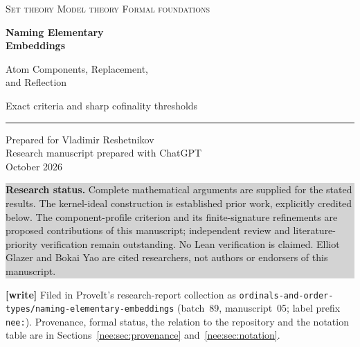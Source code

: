 \documentclass[11pt,letterpaper]{article}
\numberwithin{equation}{section}
\theoremstyle{plain}
\theoremstyle{definition}
\theoremstyle{remark}
\newcommand{\status}[1]{\par\noindent\colorbox{lightgray}{\parbox{\dimexpr\linewidth-2\fboxsep\relax}{#1}}\par}
\begin{document}
\hypersetup{pageanchor=false}
\begin{titlepage}
\color{ink}
\noindent\textsc{Set theory \;\textbar\; Model theory \;\textbar\; Formal foundations}
\vspace{1.1in}
\begin{flushleft}
{\Huge\bfseries Naming Elementary\\[5pt] Embeddings}\par
\vspace{0.25in}
{\Large Atom Components, Replacement,\\[3pt] and Reflection}\par
\vspace{0.32in}
{\large Exact criteria and sharp cofinality thresholds}\par
\end{flushleft}
\vspace{0.35in}
\noindent\rule{\linewidth}{0.7pt}
\vspace{0.2in}
\noindent Prepared for Vladimir Reshetnikov\\
Research manuscript prepared with ChatGPT\\
October 2026
\vfill
\status{\textbf{Research status.} Complete mathematical arguments are supplied for the stated results. The kernel-ideal construction is established prior work, explicitly credited below. The component-profile criterion and its finite-signature refinements are proposed contributions of this manuscript; independent review and literature-priority verification remain outstanding. No Lean verification is claimed. Elliot Glazer and Bokai Yao are cited researchers, not authors or endorsers of this manuscript.}
\vspace{6pt}
{\footnotesize\noindent\textbf{[write]} Filed in ProveIt's research-report collection as \texttt{ordinals-and-order-types/naming-elementary-embeddings} (batch~89, manuscript~05; label prefix \texttt{nee:}). Provenance, formal status, the relation to the repository and the notation table are in Sections~\ref{nee:sec:provenance} and~\ref{nee:sec:notation}.\par}
\end{titlepage}
\hypersetup{pageanchor=true}
\end{document}
